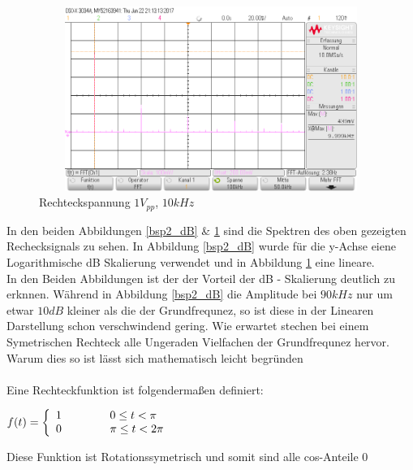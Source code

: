 \begin{figure}[H]
 \begin{center}
  \includegraphics[height=6cm,width=12cm]{OsziBilder/bsp2_Hanning_RMS_Cursor.png}
 \end{center}
 \caption{Rechteckspannung $1V_{pp}$, $10kHz$}\label{bsp2_rms}
\end{figure}
\noindent
In den beiden Abbildungen \ref{bsp2_dB} \& \ref{bsp2_rms} sind die Spektren des oben gezeigten Rechecksignals zu sehen. In Abbildung \ref{bsp2_dB} wurde f\"ur die y-Achse eiene Logarithmische dB Skalierung verwendet und in Abbildung \ref{bsp2_rms} eine lineare. \\
In den Beiden Abbildungen ist der der Vorteil der dB - Skalierung deutlich zu erknnen. W\"ahrend in Abbildung \ref{bsp2_dB} die Amplitude bei $90kHz$ nur um etwar $10dB$ kleiner als die der Grundfrequnez, so ist diese in der Linearen Darstellung schon verschwindend gering. \newpage \noindent
Wie erwartet stechen bei einem Symetrischen Rechteck alle Ungeraden Vielfachen der Grundfrequnez hervor. Warum dies so ist l\"asst sich mathematisch leicht begr\"unden \\ \\
Eine Rechteckfunktion ist folgenderma\ss{}en definiert:
\begin{center}
    $f(t) = \left\{\begin{array}{ll}
            1        \hspace{1.5cm} 0\leq t < \pi\\
            0        \hspace{1.5cm} \pi \leq t < 2\pi
            \end{array}\right.$
\end{center}
\noindent
Diese Funktion ist Rotationssymetrisch und somit sind alle cos-Anteile 0
